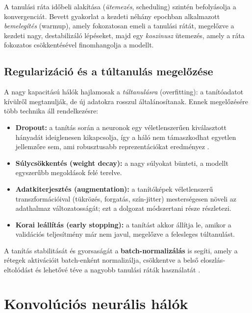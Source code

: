 A tanulási ráta időbeli alakítása (\textit{ütemezés}, scheduling) szintén
befolyásolja a konvergenciát. Bevett gyakorlat a kezdeti néhány epochban
alkalmazott \textit{bemelegítés} (warmup), amely fokozatosan emeli a tanulási
rátát, megelőzve a kezdeti nagy, destabilizáló lépéseket, majd egy
\textit{koszinusz} ütemezés, amely a ráta fokozatos csökkentésével finomhangolja
a modellt.

\subsection{Regularizáció és a túltanulás megelőzése}

A nagy kapacitású hálók hajlamosak a \textit{túltanulásra} (overfitting): a
tanítóadatot kívülről megtanulják, de új adatokra rosszul általánosítanak. Ennek
megelőzésére több technika áll rendelkezésre:

\begin{itemize}
  \item \textbf{Dropout:} a tanítás során a neuronok egy véletlenszerűen
  kiválasztott hányadát ideiglenesen kikapcsolja, így a háló nem támaszkodhat
  egyetlen jellemzőre sem, ami robusztusabb reprezentációkat eredményez
  \cite{srivastava2014dropout}.
  \item \textbf{Súlycsökkentés (weight decay):} a nagy súlyokat bünteti, a
  modellt egyszerűbb megoldások felé terelve.
  \item \textbf{Adatkiterjesztés (augmentation):} a tanítóképek véletlenszerű
  transzformációival (tükrözés, forgatás, szín-jitter) mesterségesen növeli az
  adathalmaz változatosságát; ezt a dolgozat módszertani része részletezi.
  \item \textbf{Korai leállítás (early stopping):} a tanítást akkor állítja le,
  amikor a validációs teljesítmény már nem javul, megelőzve a felesleges
  túltanulást.
\end{itemize}

A tanítás stabilitását és gyorsaságát a \textbf{batch-normalizálás} is segíti,
amely a rétegek aktivációit batch-enként normalizálja, csökkentve a belső
eloszlás-eltolódást és lehetővé téve a nagyobb tanulási ráták használatát
\cite{ioffe2015batchnorm}.

\section{Konvolúciós neurális hálók}

